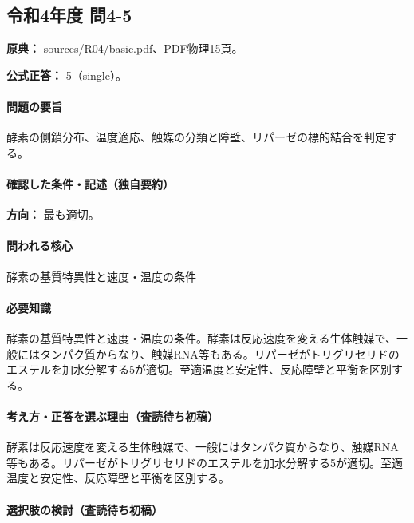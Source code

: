 \subsection{令和4年度 問4-5}
\label{q:r04-reg-basic-4-5}

\noindent\textbf{原典：} sources/R04/basic.pdf、PDF物理15頁。

\textbf{公式正答：} 5（single）。

\paragraph{問題の要旨} 酵素の側鎖分布、温度適応、触媒の分類と障壁、リパーゼの標的結合を判定する。

\paragraph{確認した条件・記述（独自要約）}\mbox{}\par

\noindent\textbf{方向：} 最も適切。\par

\paragraph{問われる核心} 酵素の基質特異性と速度・温度の条件

\paragraph{必要知識} 酵素の基質特異性と速度・温度の条件。酵素は反応速度を変える生体触媒で、一般にはタンパク質からなり、触媒RNA等もある。リパーゼがトリグリセリドのエステルを加水分解する5が適切。至適温度と安定性、反応障壁と平衡を区別する。

\paragraph{考え方・正答を選ぶ理由（査読待ち初稿）} 酵素は反応速度を変える生体触媒で、一般にはタンパク質からなり、触媒RNA等もある。リパーゼがトリグリセリドのエステルを加水分解する5が適切。至適温度と安定性、反応障壁と平衡を区別する。

\paragraph{選択肢の検討（査読待ち初稿）}\mbox{}\par

